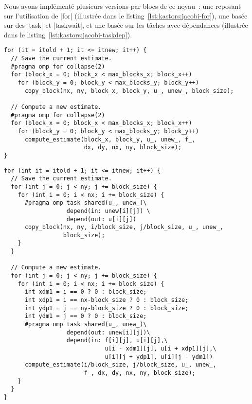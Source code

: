 Nous avons implémenté plusieurs versions par blocs de ce noyau~: une reposant sur l'utilisation de |for| (illustrée dans le listing~\ref{lst:kastors:jacobi-for}), une basée sur des |task| et |taskwait|, et une basée sur les tâches avec dépendances (illustrée dans le listing~\ref{lst:kastors:jacobi-taskdep}).

\begin{lstlisting}[caption=Boucle itérative principale de Jacobi utilisant des for,label=lst:kastors:jacobi-for]
for (it = itold + 1; it <= itnew; it++) {
  // Save the current estimate.
  #pragma omp for collapse(2)
  for (block_x = 0; block_x < max_blocks_x; block_x++)
    for (block_y = 0; block_y < max_blocks_y; block_y++)
      copy_block(nx, ny, block_x, block_y, u_, unew_, block_size);

  // Compute a new estimate.
  #pragma omp for collapse(2)
  for (block_x = 0; block_x < max_blocks_x; block_x++)
    for (block_y = 0; block_y < max_blocks_y; block_y++)
      compute_estimate(block_x, block_y, u_, unew_, f_,
                       dx, dy, nx, ny, block_size);
}
\end{lstlisting}


\begin{lstlisting}[caption=Boucle itérative principale de Jacobi utilisant des tâches avec dépendances,label=lst:kastors:jacobi-taskdep]
for (int it = itold + 1; it <= itnew; it++) {
  // Save the current estimate.
  for (int j = 0; j < ny; j += block_size) {
    for (int i = 0; i < nx; i += block_size) {
      #pragma omp task shared(u_, unew_)\
                  depend(in: unew[i][j]) \
                  depend(out: u[i][j])
      copy_block(nx, ny, i/block_size, j/block_size, u_, unew_,
                 block_size);
    }
  }

  // Compute a new estimate.
  for (int j = 0; j < ny; j += block_size) {
    for (int i = 0; i < nx; i += block_size) {
      int xdm1 = i == 0 ? 0 : block_size;
      int xdp1 = i == nx-block_size ? 0 : block_size;
      int ydp1 = j == ny-block_size ? 0 : block_size;
      int ydm1 = j == 0 ? 0 : block_size;
      #pragma omp task shared(u_, unew_)\
                  depend(out: unew[i][j])\
                  depend(in: f[i][j], u[i][j],\
                             u[i - xdm1][j], u[i + xdp1][j],\
                             u[i][j + ydp1], u[i][j - ydm1])
      compute_estimate(i/block_size, j/block_size, u_, unew_,
                       f_, dx, dy, nx, ny, block_size);
    }
  }
}
\end{lstlisting}

